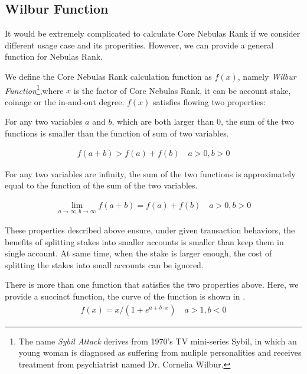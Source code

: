 \subsection{Wilbur Function \label{sec:function}}
It would be extremely complicated to calculate Core Nebulas Rank if we consider different usage case and its properities. However, we can provide a general function for Nebulas Rank.

We define the Core Nebulas Rank calculation function as \(f(x)\), namely \emph{Wilbur Function}\footnote{The name \emph{Sybil Attack} derives from 1970's TV mini-series Sybil, in which an young woman is diagnosed as suffering from muliple personalities and receives treatment from psychiatrist named Dr. Cornelia Wilbur.},where \(x\) is the factor of Core Nebulas Rank, it can be account stake, coinage or the in-and-out degree. $f(x)$ satisfies flowing two properties:

\begin{property}
\label{prop:one}
For any two variables $a$ and $b$, which are both larger than $0$, the sum of the two functions is smaller than the function of sum of two variables.
\end{property}

\begin{align}
f(a+b)>f(a)+f(b) \quad a>0,b>0
\end{align}

\begin{property}
\label{prop:two}
For any two variables are infinity, the sum of the two functions is approximately equal to the function of the sum of the two variables.
\end{property}

\begin{align}
\lim\limits_{a \to \infty, b\to \infty} f(a+b) = f(a) + f(b)\quad a>0, b>0
\end{align}

These properties described above ensure, under given transaction behaviors, the benefits of splitting stakes into smaller accounts is smaller than keep them in single account. At same time, when the stake is larger enough, the cost of splitting the stakes into small accounts can be ignored. 

There is more than one function that satisfies the two properties above. Here, we provide a succinct function, the curve of the function is shown in .
\begin{align}
f(x) = x/(1 + e^{a + b\cdot x}) \quad a>1,b<0
\end{align}

